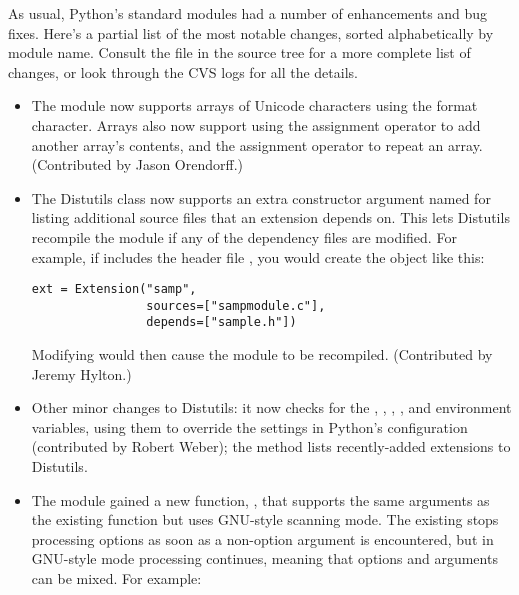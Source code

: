 \documentclass{howto}
\begin{document}
As usual, Python's standard modules had a number of enhancements and
bug fixes.  Here's a partial list of the most notable changes, sorted
alphabetically by module name. Consult the
 file in the source tree for a more
complete list of changes, or look through the CVS logs for all the
details.

\begin{itemize}

\item The  module now supports arrays of Unicode
characters using the  format character.  Arrays also now
support using the \code{+=} assignment operator to add another array's
contents, and the \code{*=} assignment operator to repeat an array.
(Contributed by Jason Orendorff.)

\item The Distutils  class now supports
an extra constructor argument named  for listing
additional source files that an extension depends on.  This lets
Distutils recompile the module if any of the dependency files are
modified.  For example, if  includes the header
file , you would create the  object like
this:

\begin{verbatim}
ext = Extension("samp",
                sources=["sampmodule.c"],
                depends=["sample.h"])
\end{verbatim}

Modifying  would then cause the module to be recompiled.
(Contributed by Jeremy Hylton.)

\item Other minor changes to Distutils:
it now checks for the , , ,
, and  environment variables, using
them to override the settings in Python's configuration (contributed
by Robert Weber); the  method lists
recently-added extensions to Distutils.

\item The  module gained a new function,
, that supports the same arguments as the existing
 function but uses GNU-style scanning mode.
The existing  stops processing options as soon as a
non-option argument is encountered, but in GNU-style mode processing
continues, meaning that options and arguments can be mixed.  For
example:


\end{itemize}
\end{document}
